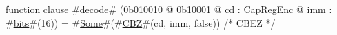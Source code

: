 function clause #\hyperref[zdecode]{decode}# (0b010010 @ 0b10001 @ cd : CapRegEnc @ imm : #\hyperref[zbits]{bits}#(16)) = #\hyperref[zSome]{Some}#(#\hyperref[zCBZ]{CBZ}#(cd, imm, false)) /* CBEZ */
